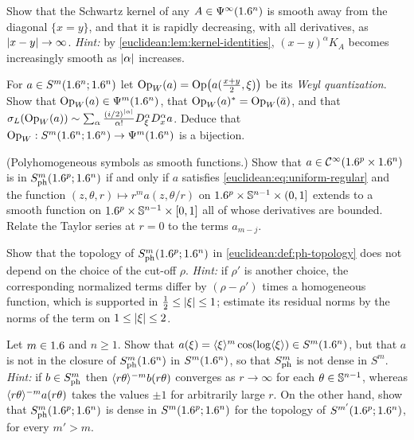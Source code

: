 \begin{exercise}\label{euclidean:ex:off-diagonal}
  Show that the Schwartz kernel of any $A\in\Psi^{\infty}(1.6^n)$ is smooth
  away from the diagonal $\{x=y\}$, and that it is rapidly decreasing, with all
  derivatives, as $\lvert x-y\rvert\to\infty$. \emph{Hint:} by
  \cref{euclidean:lem:kernel-identities}, $(x-y)^\alpha K_A$ becomes
  increasingly smooth as $\lvert \alpha\rvert$ increases.
\end{exercise}

\begin{exercise}\label{euclidean:ex:weyl}
  For $a\in S^m(1.6^n;1.6^n)$ let $\operatorname{Op}_W(a)=\operatorname{Op}\bigl(a(\tfrac{x+y}2,\xi)\bigr)$ be
  its \emph{Weyl quantization}. Show that $\operatorname{Op}_W(a)\in\Psi^{m}(1.6^n)$, that
  $\operatorname{Op}_W(a)^*=\operatorname{Op}_W(\bar a)$, and that
  $\sigma_L(\operatorname{Op}_W(a))\sim\sum_\alpha\frac{(i/2)^{\lvert \alpha\rvert}}{\alpha!}D^\alpha_\xi D^\alpha_xa$.
  Deduce that $\operatorname{Op}_W:S^m(1.6^n;1.6^n)\to\Psi^{m}(1.6^n)$ is a bijection.
\end{exercise}

\begin{exercise}\label{euclidean:ex:ph-smooth}
  (Polyhomogeneous symbols as smooth functions.) Show that
  $a\in\mathcal{C}^\infty(1.6^p\times1.6^n)$ is in $S^{m}_{\mathrm{ph}}(1.6^p;1.6^n)$ if and only if
  $a$ satisfies \eqref{euclidean:eq:uniform-regular} and the function
  $(z,\theta,r)\mapsto r^ma(z,\theta/r)$ on
  $1.6^p\times\mathbb{S}^{n-1}\times(0,1]$ extends to a smooth function on
  $1.6^p\times\mathbb{S}^{n-1}\times[0,1]$ all of whose derivatives are bounded.
  Relate the Taylor series at $r=0$ to the terms $a_{m-j}$.
\end{exercise}

\begin{exercise}\label{euclidean:ex:ph-complete}
  Show that the topology of $S^{m}_{\mathrm{ph}}(1.6^p;1.6^n)$ in
  \cref{euclidean:def:ph-topology} does not depend on the choice of the
  cut-off $\rho$. \emph{Hint:} if $\rho'$ is another choice, the
  corresponding normalized terms differ by $(\rho-\rho')$ times a homogeneous
  function, which is supported in $\frac12\le\lvert \xi\rvert\le1$; estimate its
  residual norms by the norms of the term on $1\le\lvert \xi\rvert\le2$.
\end{exercise}

\begin{exercise}\label{euclidean:ex:ph-not-dense}
  Let $m\in1.6$ and $n\ge1$. Show that
  $a(\xi)=\langle \xi\rangle^m\cos(\log\langle \xi\rangle)\in S^m(1.6^n)$, but that $a$ is not in
  the closure of $S^{m}_{\mathrm{ph}}(1.6^n)$ in $S^m(1.6^n)$, so that $S^{m}_{\mathrm{ph}}$ is not
  dense in $S^m$. \emph{Hint:} if $b\in S^{m}_{\mathrm{ph}}$ then $\langle r\theta\rangle^{-m}b(r\theta)$
  converges as $r\to\infty$ for each $\theta\in\mathbb{S}^{n-1}$, whereas
  $\langle r\theta\rangle^{-m}a(r\theta)$ takes the values $\pm1$ for arbitrarily
  large $r$. On the other hand, show that $S^{m}_{\mathrm{ph}}(1.6^p;1.6^n)$ is dense in
  $S^m(1.6^p;1.6^n)$ for the topology of $S^{m'}(1.6^p;1.6^n)$, for every $m'>m$.
\end{exercise}

